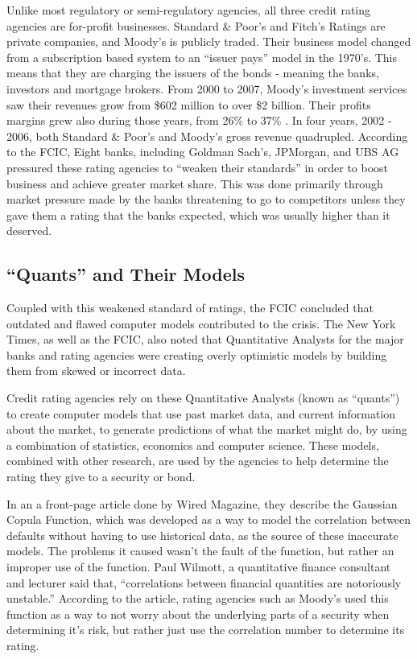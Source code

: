 \documentclass[11pt]{article}
\begin{document}
\begin{multicols}{2}
Unlike most regulatory or semi-regulatory agencies, all three credit rating agencies are for-profit businesses.  Standard \& Poor's and Fitch's Ratings are private companies, and Moody's is publicly traded.  Their business model changed from a subscription based system to an ``issuer pays'' model in the 1970's. \cite{CivilLiability, gatekeepers}  This means that they are charging the issuers of the bonds - meaning the banks, investors and mortgage brokers.  From 2000 to 2007, Moody's investment services saw their revenues grow from \$602 million to over \$2 billion. Their profits margins grew also during those years, from 26\% to 37\% \cite[p.149]{govtReport}.  In four years, 2002 - 2006, both Standard \& Poor's and Moody's gross revenue quadrupled.  According to the FCIC, Eight banks, including Goldman Sach's, JPMorgan, and UBS AG pressured these rating agencies to ``weaken their standards'' in order to boost business and achieve greater market share. \cite{ratingEthics} This was done primarily through market pressure made by the banks threatening to go to competitors unless they gave them a rating that the banks expected, which was usually higher than it deserved. \cite[p.210]{govtReport}

\subsection{``Quants'' and Their Models}

Coupled with this weakened standard of ratings, the FCIC concluded that outdated and flawed computer models contributed to the crisis. \cite[p.~xxv]{govtReport} The New York Times, as well as the FCIC, also noted that Quantitative Analysts for the major banks and rating agencies were creating overly optimistic models by building them from skewed or incorrect data. \cite{nyTimesQuants}\cite[p.xxv]{govtReport}  

Credit rating agencies rely on these Quantitative Analysts (known as ``quants'') to create computer models that use past market data, and current information about the market, to generate predictions of what the market might do, by using a combination of statistics, economics and computer science. These models, combined with other research, are used by the agencies to help determine the rating they give to a security or bond.\cite{quantsRole} 

In an a front-page article done by Wired Magazine, they describe the Gaussian Copula Function, which was developed as a way to model the correlation between defaults without having to use historical data, as the source of these inaccurate models.  The problems it caused wasn't the fault of the function, but rather an improper use of the function.  Paul Wilmott, a quantitative finance consultant and lecturer said that, ``correlations between financial quantities are notoriously unstable.''  According to the article, rating agencies such as Moody's used this function as a way to not worry about the underlying parts of a security when determining it's risk, but rather just use the correlation number to determine its rating. \cite{wiredFormula}


\end{multicols}
\end{document}
